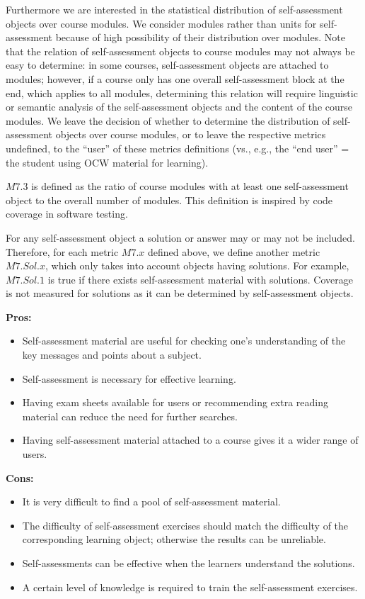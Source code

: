 \documentclass{sig-alternate}
\theoremstyle{definition}
\begin{document}
Furthermore we are interested in the statistical distribution of self-assessment objects over course modules.
We consider modules rather than units for self-assessment because of high possibility of their distribution over modules.
Note that the relation of self-assessment objects to course modules may not always be easy to determine: in some courses, self-assessment objects are attached to modules; however, if a course only has one overall self-assessment block at the end, which applies to all modules, determining this relation will require linguistic or semantic analysis of the self-assessment objects and the content of the course modules.
We leave the decision of whether to determine the distribution of self-assessment objects over course modules, or to leave the respective metrics undefined, to the ``user'' of these metrics definitions (vs., e.g., the ``end user'' = the student using OCW material for learning).

$M7.3$ is defined as the ratio of course modules with at least one self-assessment object to the overall number of modules.
This definition is inspired by code coverage in software testing.

For any self-assessment object a solution or answer may or may not be included.
Therefore, for each metric $M7.x$ defined above, we define another metric $M7.{\mathit{Sol}}.x$, which only takes into account objects having solutions.
For example, $M7.{\mathit{Sol}}.1$ is true if there exists self-assessment material with solutions.
Coverage is not measured for solutions as it can be determined by self-assessment objects.

\noindent\textbf{Pros:}
\begin{itemize}
\item Self-assessment material are useful for checking one's understanding of the key messages and points about a subject.
\item Self-assessment is necessary for effective learning.
\item Having exam sheets available for users or recommending extra reading material can reduce the need for further searches.
\item Having self-assessment material attached to a course gives it a wider range of users.
\end{itemize}
\noindent\textbf{Cons:}
\begin{itemize}
\item It is very difficult to find a pool of self-assessment material.
\item The difficulty of self-assessment exercises should match the difficulty of the corresponding learning object; otherwise the results can be unreliable.
\item Self-assessments can be effective when the learners understand the solutions.
\item A certain level of knowledge is required to train the self-assessment exercises.
\end{itemize}
\end{document}

